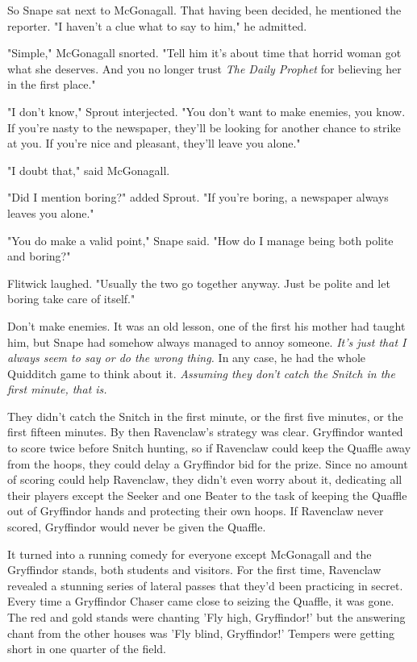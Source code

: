\documentclass[a4paper,11pt]{article}
\begin{document}
So Snape sat next to McGonagall. That having been decided, he mentioned the reporter. "I haven't a clue what to say to him," he admitted.

"Simple," McGonagall snorted. "Tell him it's about time that horrid woman got what she deserves. And you no longer trust \emph{The Daily Prophet} for believing her in the first place."

"I don't know," Sprout interjected. "You don't want to make enemies, you know. If you're nasty to the newspaper, they'll be looking for another chance to strike at you. If you're nice and pleasant, they'll leave you alone."

"I doubt that," said McGonagall.

"Did I mention boring?" added Sprout. "If you're boring, a newspaper always leaves you alone."

"You do make a valid point," Snape said. "How do I manage being both polite and boring?"

Flitwick laughed. "Usually the two go together anyway. Just be polite and let boring take care of itself."

Don't make enemies. It was an old lesson, one of the first his mother had taught him, but Snape had somehow always managed to annoy someone. \emph{It's just that I always seem to say or do the wrong thing.} In any case, he had the whole Quidditch game to think about it. \emph{Assuming they don't catch the Snitch in the first minute, that is.}

They didn't catch the Snitch in the first minute, or the first five minutes, or the first fifteen minutes. By then Ravenclaw's strategy was clear. Gryffindor wanted to score twice before Snitch hunting, so if Ravenclaw could keep the Quaffle away from the hoops, they could delay a Gryffindor bid for the prize. Since no amount of scoring could help Ravenclaw, they didn't even worry about it, dedicating all their players except the Seeker and one Beater to the task of keeping the Quaffle out of Gryffindor hands and protecting their own hoops. If Ravenclaw never scored, Gryffindor would never be given the Quaffle.

It turned into a running comedy for everyone except McGonagall and the Gryffindor stands, both students and visitors. For the first time, Ravenclaw revealed a stunning series of lateral passes that they'd been practicing in secret. Every time a Gryffindor Chaser came close to seizing the Quaffle, it was gone. The red and gold stands were chanting 'Fly high, Gryffindor!' but the answering chant from the other houses was 'Fly blind, Gryffindor!' Tempers were getting short in one quarter of the field.
\end{document}
